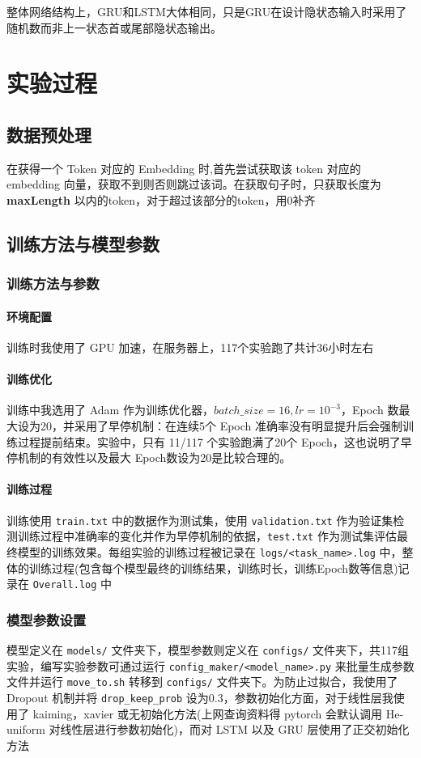 \documentclass{article}
\begin{document}
\begin{spacing}{1.1}
	整体网络结构上，GRU和LSTM大体相同，只是GRU在设计隐状态输入时采用了随机数而非上一状态首或尾部隐状态输出。

\section{实验过程}
	\subsection{数据预处理}
	\hspace{1.4em}
	在获得⼀个 Token 对应的 Embedding 时,首先尝试获取该 token 对应的 embedding 向量，获取不到则否则跳过该词。在获取句子时，只获取长度为 \textbf{maxLength} 以内的token，对于超过该部分的token，用0补齐
	
	\subsection{训练方法与模型参数}
		\subsubsection{训练方法与参数}
		
		\paragraph*{环境配置} 训练时我使用了 GPU 加速，在服务器上，117个实验跑了共计36小时左右
		\paragraph*{训练优化} 训练中我选用了 Adam 作为训练优化器，$batch\_size=16, lr =10^{-3}$，Epoch 数最大设为20，并采用了早停机制：在连续5个 Epoch 准确率没有明显提升后会强制训练过程提前结束。实验中，只有 11/117 个实验跑满了20个 Epoch，这也说明了早停机制的有效性以及最大 Epoch数设为20是比较合理的。\label{EarlyStop}
		
		\paragraph*{训练过程} 训练使用 \verb|train.txt| 中的数据作为测试集，使用 \verb|validation.txt| 作为验证集检测训练过程中准确率的变化并作为早停机制的依据，\verb|test.txt| 作为测试集评估最终模型的训练效果。每组实验的训练过程被记录在 \verb|logs/<task_name>.log| 中，整体的训练过程(包含每个模型最终的训练结果，训练时长，训练Epoch数等信息)记录在 \verb|Overall.log| 中
	
		\subsubsection{模型参数设置}
		\hspace{1.4em}
		模型定义在 \verb|models/| 文件夹下，模型参数则定义在 \verb|configs/| 文件夹下，共117组实验，编写实验参数可通过运行 \verb|config_maker/<model_name>.py| 来批量生成参数文件并运行 \verb|move_to.sh| 转移到 \verb|configs/| 文件夹下。为防止过拟合，我使用了 Dropout 机制并将 \verb|drop_keep_prob| 设为0.3，参数初始化方面，对于线性层我使用了 kaiming，xavier 或无初始化方法(上网查询资料得 pytorch 会默认调用 He-uniform 对线性层进行参数初始化)，而对 LSTM 以及 GRU 层使用了正交初始化方法
		

\end{spacing}
\end{document}
